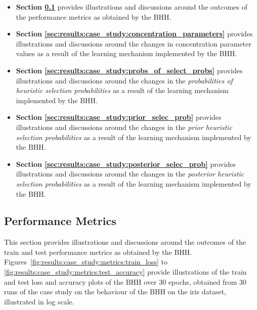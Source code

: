 \begin{itemize}
      \item \textbf{Section \ref{sec:results:case_study:performance_metrics}} provides illustrations and discussions around the outcomes of the performance metrics as obtained by the \acs{BHH}.

      \item \textbf{Section \ref{sec:results:case_study:concentration_parameters}} provides illustrations and discussions around the changes in concentration parameter values as a result of the learning mechanism implemented by the \acs{BHH}.

      \item \textbf{Section \ref{sec:results:case_study:probs_of_select_probs}} provides illustrations and discussions around the changes in the \textit{probabilities of heuristic selection probabilities} as a result of the learning mechanism implemented by the \acs{BHH}.

      \item \textbf{Section \ref{sec:results:case_study:prior_selec_prob}} provides illustrations and discussions around the changes in the \textit{prior heuristic selection probabilities} as a result of the learning mechanism implemented by the \acs{BHH}.

      \item \textbf{Section \ref{sec:results:case_study:posterior_selec_prob}} provides illustrations and discussions around the changes in the \textit{posterior heuristic selection probabilities} as a result of the learning mechanism implemented by the \acs{BHH}.


\end{itemize}

\subsection{Performance Metrics}\label{sec:results:case_study:performance_metrics}

This section provides illustrations and discussions around the outcomes of the train and test performance metrics as obtained by the \acs{BHH}. Figures~\ref{fig:results:case_study:metrics:train_loss} to \ref{fig:results:case_study:metrics:test_accuracy} provide illustrations of the train and test loss and accuracy plots of the \acs{BHH} over 30 epochs, obtained from 30 runs of the case study on the behaviour of the \acs{BHH} on the iris dataset, illustrated in log scale.

